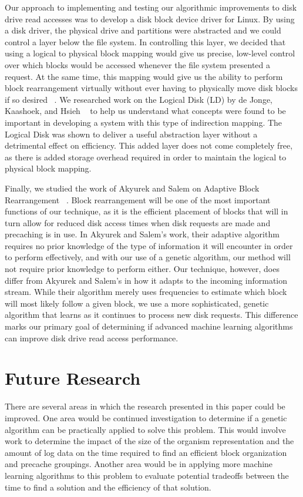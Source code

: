 \documentclass[letterpaper,twocolumn,10pt]{article}
\begin{document}
Our approach to implementing and testing our algorithmic improvements to disk drive read accesses was to develop a disk block device driver for Linux.  By using a disk driver, the physical drive and partitions were abstracted and we could control a layer below the file system.  In controlling this layer, we decided that using a logical to physical block mapping would give us precise, low-level control over which blocks would be accessed whenever the file system presented a request.  At the same time, this mapping would give us the ability to perform block rearrangement virtually without ever having to physically move disk blocks if so desired ~\cite{Loge}.  We researched work on the Logical Disk (LD) by de Jonge, Kaashoek, and Hsieh ~\cite{LogicalDisk} to help us understand what concepts were found to be important in developing a system with this type of indirection mapping.  The Logical Disk was shown to deliver a useful abstraction layer without a detrimental effect on efficiency.  This added layer does not come completely free, as there is added storage overhead required in order to maintain the logical to physical block mapping.

Finally, we studied the work of Akyurek and Salem on Adaptive Block Rearrangement ~\cite{AdaptiveBlock}.  Block rearrangement will be one of the most important functions of our technique, as it is the efficient placement of blocks that will in turn allow for reduced disk access times when disk requests are made and precaching is in use.  In Akyurek and Salem's work, their adaptive algorithm requires no prior knowledge of the type of information it will encounter in order to perform effectively, and with our use of a genetic algorithm, our method will not require prior knowledge to perform either.  Our technique, however, does differ from Akyurek and Salem's in how it adapts to the incoming information stream.  While their algorithm merely uses frequencies to estimate which block will most likely follow a given block, we use a more sophisticated, genetic algorithm that learns as it continues to process new disk requests.  This difference marks our primary goal of determining if advanced machine learning algorithms can improve disk drive read access performance.

\section{Future Research}
There are several areas in which the research presented in this paper could be improved.  One area would be continued investigation to determine if a genetic algorithm can be practically applied to solve this problem.  This would involve work to determine the impact of the size of the organism representation and the amount of log data on the time required to find an efficient block organization and precache groupings.  Another area would be in applying more machine learning algorithms to this problem to evaluate potential tradeoffs between the time to find a solution and the efficiency of that solution.
\end{document}
